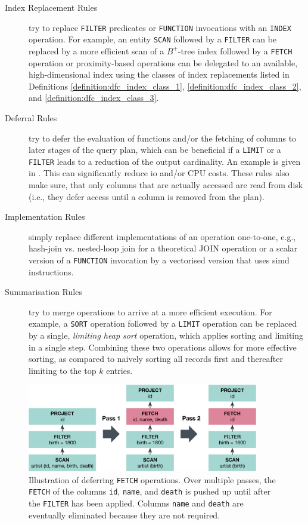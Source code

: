 \begin{description}
    \item[Index Replacement Rules] try to replace \texttt{FILTER} predicates or \texttt{FUNCTION} invocations with an  \texttt{INDEX} operation. For example, an entity \texttt{SCAN} followed by a \texttt{FILTER} can be replaced by a more efficient scan of a $B^{+}$-tree index followed by a \texttt{FETCH} operation or proximity-based operations can be delegated to an available, high-dimensional index using the classes of index replacements listed in Definitions \ref{definition:dfc_index_class_1}, \ref{definition:dfc_index_class_2}, and \ref{definition:dfc_index_class_3}.
 
    \item[Deferral Rules] try to defer the evaluation of functions and/or the fetching of columns to later stages of the query plan, which can be beneficial if a \texttt{LIMIT} or a \texttt{FILTER} leads to a reduction of the output cardinality. An example is given in . This can significantly reduce \acrshort{io} and/or CPU costs. These rules also make sure, that only columns that are actually accessed are read from disk (i.e., they defer access until a column is removed from the plan).

    \item[Implementation Rules] simply replace different implementations of an operation one-to-one, e.g., hash-join vs. nested-loop join for a theoretical JOIN operation or a scalar version of a \texttt{FUNCTION} invocation by a vectorised version that uses \acrshort{simd} instructions.

    \item[Summarisation Rules] try to merge operations to arrive at a more efficient execution. For example, a \texttt{SORT} operation followed by a  \texttt{LIMIT} operation can be replaced by a single, \emph{limiting heap sort} operation, which applies sorting and limiting in a single step. Combining these two operations allows for more effective sorting, as compared to naively sorting all records first and thereafter limiting to the top $k$ entries.
\end{description}


\begin{figure}[bt]
    \centering
    \includegraphics[width=0.9\textwidth]{figures/physical-rule-fetch}
    \caption{Illustration of deferring \texttt{FETCH} operations. Over multiple passes, the \texttt{FETCH} of the columns \texttt{id}, \texttt{name}, and \texttt{death} is pushed up until after the \texttt{FILTER} has been applied. Columns \texttt{name} and \texttt{death} are eventually eliminated because they are not required.}
    \label{figure:cottontail_physical_rule_fetch}
\end{figure}

